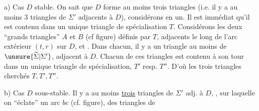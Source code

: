 a) Cas $D$ stable. On sait que $D$ forme au moins trois triangles (i.e. il y a au moins $3$ triangles de $\Sigma'$ adjacents à $D$), considérons en un. Il est immédiat qu'il est contenu dans un unique triangle de spécialisation $T$. Considérons les deux ``grands triangles''  $A$ et $B$ (cf figure) définis par $T$,  adjacents le long de l'arc extérieur $(t,r)$ sur $D$, et . Dans chacun, il y a un triangle au moins de $\unsure{\widetilde\Sigma|\Sigma'}$, adjacent à $D$. Chacun de ces triangles est contenu à son tour dans un unique triangle de spécialisation, $T'$ resp. $T''$. D'où les trois triangles cherchés $T,T',T''$.

b) Cas $D$ sous-stable.  Il y a au moins \uline{trois} triangles  de $\Sigma'$ adj. à $D$,  , sur laquelle on ``éclate'' un arc $bc$ (cf. figure),  des triangles de

